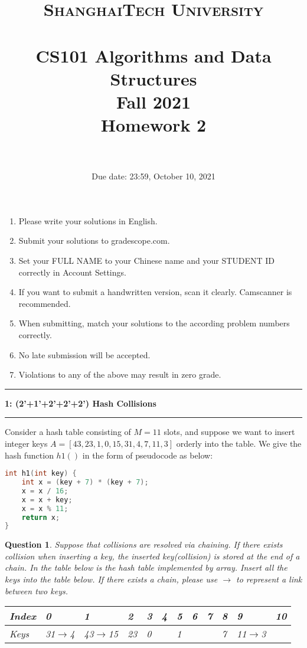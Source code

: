 \documentclass[10.5pt]{article}
\title{
	\normalfont \normalsize
	\textsc{ShanghaiTech University} \\ [25pt]
	\horrule{0.5pt} \\[0.4cm] %
	\huge CS101 Algorithms and Data Structures\\ %
	\LARGE Fall 2021\\
	\LARGE Homework 2\\
	\horrule{2pt} \\[0.5cm] %
}
\author{}
\date{Due date: 23:59, October 10, 2021}
\newcommand\question[2]{\vspace{.25in}\hrule\textbf{#1: #2}\vspace{.5em}\hrule\vspace{.10in}}
\newtheorem{Q}{Question}
\begin{document}
	
	\maketitle
	\thispagestyle{firstpage}
	\vspace{3ex}
	
	\begin{enumerate}
		\item Please write your solutions in English. 
		
		\item Submit your solutions to gradescope.com.  
		
		\item Set your FULL NAME to your Chinese name and your STUDENT ID correctly in Account Settings. 
		
		\item If you want to submit a handwritten version, scan it clearly. Camscanner is recommended. 
		
		\item When submitting, match your solutions to the according problem numbers correctly. 
		
		\item No late submission will be accepted.
		
		\item Violations to any of the above may result in zero grade. 
	\end{enumerate}
	\newpage
	
  \question{1}{(2'+1'+2'+2'+2') Hash Collisions}
    Consider a hash table consisting of $M= 11$ slots, and suppose we want to insert integer keys $A = [43, 23, 1 , 0,15 ,31 ,4 ,7 ,11 ,3]$ orderly into the table. We give the hash function $h1()$ in the form of pseudocode as below:
    
\hrulefill
\rm{
\begin{lstlisting}[language=C++]
int h1(int key) {
	int x = (key + 7) * (key + 7);
	x = x / 16;
	x = x + key;
	x = x % 11;
	return x;
}
\end{lstlisting}
}
\hrulefill
    
\begin{Q} Suppose that collisions are resolved via chaining. If there exists collision when inserting a key, the inserted key(collision) is stored at the end of a chain. In the table below is the hash table implemented by array. Insert all the keys into the table below. If there exists a chain, please use $\rightarrow$
to represent a link between two keys.
\begin{table}[ht]
\begin{tabular}{|l|p{1cm}|p{1cm}|p{1cm}|p{1cm}|p{1cm}|p{1cm}|p{1cm}|p{1cm}|p{1cm}|p{1cm}|p{1cm}|}
\hline
Index & 0&1&2&3&4&5&6&7&8&9&10 \\ \hline
Keys     &31$\rightarrow$4&43$\rightarrow$15&23&0&&1&&&7&11$\rightarrow$3&     \\ \hline
\end{tabular}
\end{table}
\end{Q}
\end{document}
